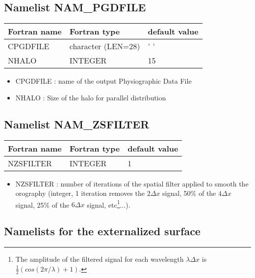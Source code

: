 \subsection{Namelist NAM\_PGDFILE}

\begin{center}
\begin{tabular} {|l|l|l|}
\hline
Fortran name & Fortran type & default value\\
\hline
\hline
CPGDFILE      & character (LEN=28) & ' '           \\
NHALO         & INTEGER      & 15 \\
\hline
\end{tabular}
\end{center}

\begin{itemize}
\item CPGDFILE : name of the output Physiographic Data File
\item NHALO :  Size of the halo for parallel distribution

\end{itemize}
\subsection{Namelist NAM\_ZSFILTER}

\begin{center}
\begin{tabular} {|l|l|l|}
\hline
Fortran name & Fortran type & default value\\
\hline
\hline
NZSFILTER       & INTEGER      & 1 \\
\hline
\end{tabular}
\end{center}

\begin{itemize}
\item NZSFILTER : number of iterations of the spatial filter applied to smooth the orography (integer, 1 iteration removes the $2\Delta x$ signal, 50\% of the $4\Delta x$
signal, 25\% of the $6\Delta x$ signal, etc\footnote{The amplitude of the
filtered signal for each wavelength $\lambda\Delta x$ 
is $\frac{1}{2}\left( cos(2\pi/\lambda) +1\right)$.}...).
\end{itemize}
\subsection{Namelists for the externalized surface}


